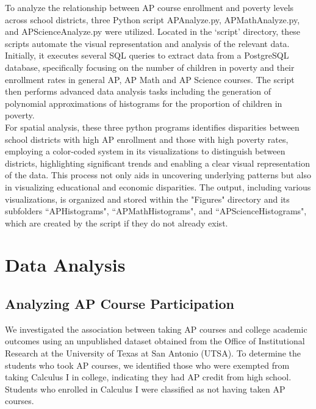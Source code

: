 \documentclass[sn-mathphys-num]{sn-jnl}%
\theoremstyle{thmstyleone}%
\theoremstyle{thmstyletwo}%
\theoremstyle{thmstylethree}%
\begin{document}
{To analyze the relationship between AP course enrollment and poverty levels across school districts, three Python script APAnalyze.py, APMathAnalyze.py, and APScienceAnalyze.py were utilized. Located in the `script' directory, these scripts automate the visual representation and analysis of the relevant data. Initially, it executes several SQL queries to extract data from a PostgreSQL database, specifically focusing on the number of children in poverty and their enrollment rates in general AP, AP Math and AP Science courses. The script then performs advanced data analysis tasks including the generation of polynomial approximations of histograms for the proportion of children in poverty.\\

For spatial analysis, these three python programs identifies disparities between school districts with high AP enrollment and those with high poverty rates, employing a color-coded system in its visualizations to distinguish between districts, highlighting significant trends and enabling a clear visual representation of the data. This process not only aids in uncovering underlying patterns but also in visualizing educational and economic disparities. The output, including various visualizations, is organized and stored within the "Figures" directory and its subfolders ``APHistograms", ``APMathHistograms", and ``APScienceHistograms", which are created by the script if they do not already exist.\\


\section{Data Analysis}
\subsection{Analyzing AP Course Participation}
We investigated the association between taking AP courses and college academic outcomes using an unpublished dataset obtained from the Office of Institutional Research at the University of Texas at San Antonio (UTSA). To determine the students who took AP courses, we identified those who were exempted from taking Calculus I in college, indicating they had AP credit from high school. Students who enrolled in Calculus I were classified as not having taken AP courses.

}
\end{document}
